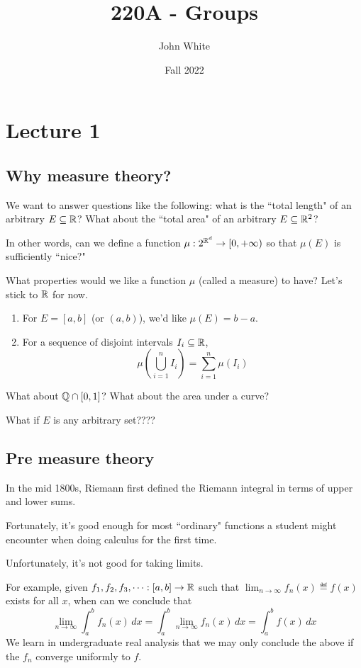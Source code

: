 \documentclass[x11names,reqno,14pt]{extarticle}
\title{220A - Groups}
\author{John White}
\date{Fall 2022}
\begin{document}
\section*{Lecture 1}

\subsection*{Why measure theory?}

We want to answer questions like the following: what is the ``total length" of an arbitrary $E \subseteq \mathbb{R}$? What about the ``total area" of an arbitrary $E \subseteq \mathbb{R}^2$? 

In other words, can we define a function $\mu:2^{\mathbb{R}^d}\to[0, + \infty)$ so that $\mu(E)$ is sufficiently ``nice?"

What properties would we like a function $\mu$ (called a measure) to have? Let's stick to $\mathbb{R}$ for now.

\begin{enumerate}
\item For $E = [a, b]$ (or $(a, b)$), we'd like $\mu(E) = b - a$.
\item For a sequence of disjoint intervals $I_i\subseteq \mathbb{R}$, 
\[
\mu\left(\bigcup_{i=1}^nI_i\right) = \sum_{i=1}^n\mu(I_i)
\]
\end{enumerate}

What about $\mathbb{Q} \cap [0, 1]$? What about the area under a curve?

What if $E$ is any arbitrary set????

\subsection*{Pre measure theory}

In the mid 1800s, Riemann first defined the Riemann integral in terms of upper and lower sums. 

Fortunately, it's good enough for most ``ordinary" functions a student might encounter when doing calculus for the first time. 

Unfortunately, it's not good for taking limits. 

For example, given $f_1, f_2, f_3, \cdots :[a, b]\to\mathbb{R}$ such that $\lim_{n\to\infty}f_n(x) \eqdef f(x)$ exists for all $x$, when can we conclude that
\[
\lim_{n\to\infty}\int_a^bf_n(x)\,dx = \int_a^b\lim_{n\to\infty}f_n(x)\,dx = \int_a^bf(x)\,dx
\]
We learn in undergraduate real analysis that we may only conclude the above if the $f_n$ converge uniformly to $f$. 
\end{document}
